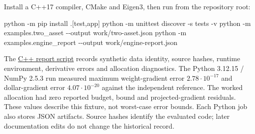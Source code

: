 \documentclass[
  american,
  11pt,
]{article}
\newenvironment{Shaded}{}{}
\newcommand{\AttributeTok}[1]{\textcolor[rgb]{0.49,0.56,0.16}{#1}}
\newcommand{\ExtensionTok}[1]{#1}
\newcommand{\NormalTok}[1]{#1}
\newcommand{\StringTok}[1]{\textcolor[rgb]{0.25,0.44,0.63}{#1}}
\begin{document}
Install a C++17 compiler, CMake and Eigen3, then run from the repository
root:

\begin{Shaded}
\begin{Highlighting}[]
\ExtensionTok{python} \AttributeTok{{-}m}\NormalTok{ pip install }\StringTok{\textquotesingle{}.[test,app]\textquotesingle{}}
\ExtensionTok{python} \AttributeTok{{-}m}\NormalTok{ unittest discover }\AttributeTok{{-}s}\NormalTok{ tests }\AttributeTok{{-}v}
\ExtensionTok{python} \AttributeTok{{-}m}\NormalTok{ examples.two\_asset }\AttributeTok{{-}{-}output}\NormalTok{ work/two{-}asset.json}
\ExtensionTok{python} \AttributeTok{{-}m}\NormalTok{ examples.engine\_report }\AttributeTok{{-}{-}output}\NormalTok{ work/engine{-}report.json}
\end{Highlighting}
\end{Shaded}

The
\href{https://github.com/eshangark/portfolio-risk-engine/blob/main/examples/engine_report.py}{C++
report script} records synthetic data identity, source hashes, runtime
environment, derivative errors and allocation diagnostics. The Python
3.12.15 / NumPy 2.5.3 run measured maximum weight-gradient error
\(2.78\cdot10^{-17}\) and dollar-gradient error \(4.07\cdot10^{-20}\)
against the independent reference. The worked allocation had zero
reported budget, bound and projected-gradient residuals. These values
describe this fixture, not worst-case error bounds. Each Python job also
stores JSON artifacts. Source hashes identify the evaluated code; later
documentation edits do not change the historical record.
\end{document}
